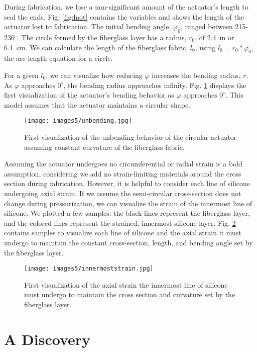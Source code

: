 During fabrication, we lose a non-significant amount of the actuator's length to seal the ends. Fig. \ref{fig:lnot} contains the variables and shows the length of the actuator lost to fabrication. The initial bending angle, $\varphi_{0}$, ranged between 215-230$^\circ$. The circle formed by the fiberglass layer has a radius, $r_{0}$, of 2.4~in or 6.1~cm. We can calculate the length of the fiberglass fabric, $l_{0}$, using $l_{0} = r_{0}*\varphi_{0}$, the arc length equation for a circle. 

For a given $l_{0}$, we can visualize how reducing $\varphi$ increases the bending radius, $r$. As $\varphi$ approaches $0^\circ$, the bending radius approaches infinity. Fig. \ref{fig:unbending} displays the first visualization of the actuator's bending behavior as $\varphi$ approaches $0^\circ$. This model assumes that the actuator maintains a circular shape. 

\begin{figure}[h]
    \centering
    \texttt{[image: images5/unbending.jpg]}
    \caption{First visualization of the unbending behavior of the circular actuator assuming constant curvature of the fiberglass fabric.}
    \label{fig:unbending}
\end{figure}

Assuming the actuator undergoes no circumferential or radial strain is a bold assumption, considering we add no strain-limiting materials around the cross section during fabrication. However, it is helpful to consider each line of silicone undergoing axial strain. If we assume the semi-circular cross-section does not change during pressurization, we can visualize the strain of the innermost line of silicone. We plotted a few samples: the black lines represent the fiberglass layer, and the colored lines represent the strained, innermost silicone layer. Fig. \ref{fig:innermoststrain} contains samples to visualize each line of silicone and the axial strain it must undergo to maintain the constant cross-section, length, and bending angle set by the fiberglass layer. 

\begin{figure}[h]
    \centering
    \texttt{[image: images5/innermoststrain.jpg]}
    \caption{First visualization of the axial strain the innermost line of silicone must undergo to maintain the cross section and curvature set by the fiberglass layer.}
    \label{fig:innermoststrain}
\end{figure}

\section{A Discovery}

